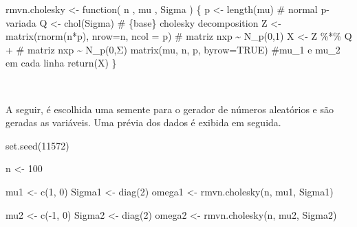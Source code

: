 \documentclass[
  a4paperpaper,
]{article}
\newenvironment{Shaded}{\begin{snugshade}}{\end{snugshade}}
\newcommand{\AttributeTok}[1]{\textcolor[rgb]{0.40,0.45,0.13}{#1}}
\newcommand{\CommentTok}[1]{\textcolor[rgb]{0.37,0.37,0.37}{#1}}
\newcommand{\ConstantTok}[1]{\textcolor[rgb]{0.56,0.35,0.01}{#1}}
\newcommand{\ControlFlowTok}[1]{\textcolor[rgb]{0.00,0.23,0.31}{#1}}
\newcommand{\DecValTok}[1]{\textcolor[rgb]{0.68,0.00,0.00}{#1}}
\newcommand{\FunctionTok}[1]{\textcolor[rgb]{0.28,0.35,0.67}{#1}}
\newcommand{\NormalTok}[1]{\textcolor[rgb]{0.00,0.23,0.31}{#1}}
\newcommand{\OtherTok}[1]{\textcolor[rgb]{0.00,0.23,0.31}{#1}}
\newcommand{\SpecialCharTok}[1]{\textcolor[rgb]{0.37,0.37,0.37}{#1}}
\begin{document}
\begin{Shaded}
\begin{Highlighting}[]
\NormalTok{rmvn.cholesky }\OtherTok{\textless{}{-}} \ControlFlowTok{function}\NormalTok{( n , mu , Sigma ) \{}
\NormalTok{  p }\OtherTok{\textless{}{-}} \FunctionTok{length}\NormalTok{(mu) }\CommentTok{\# normal p{-}variada}
\NormalTok{  Q }\OtherTok{\textless{}{-}} \FunctionTok{chol}\NormalTok{(Sigma) }\CommentTok{\# \{base\} cholesky decomposition}
\NormalTok{  Z }\OtherTok{\textless{}{-}} \FunctionTok{matrix}\NormalTok{(}\FunctionTok{rnorm}\NormalTok{(n}\SpecialCharTok{*}\NormalTok{p), }\AttributeTok{nrow=}\NormalTok{n, }\AttributeTok{ncol =}\NormalTok{ p) }\CommentTok{\# matriz nxp \textasciitilde{} N\_p(0,1)}
\NormalTok{  X }\OtherTok{\textless{}{-}}\NormalTok{ Z }\SpecialCharTok{\%*\%}\NormalTok{ Q }\SpecialCharTok{+} \CommentTok{\# matriz nxp \textasciitilde{} N\_p(0,Σ)}
          \FunctionTok{matrix}\NormalTok{(mu, n, p, }\AttributeTok{byrow=}\ConstantTok{TRUE}\NormalTok{) }\CommentTok{\#mu\_1 e mu\_2 em cada linha}
  \FunctionTok{return}\NormalTok{(X)}
\NormalTok{\}}
\end{Highlighting}
\end{Shaded}

~

A seguir, é escolhida uma semente para o gerador de números aleatórios e
são geradas as variáveis. Uma prévia dos dados é exibida em seguida.

\begin{Shaded}
\begin{Highlighting}[]
\FunctionTok{set.seed}\NormalTok{(}\DecValTok{11572}\NormalTok{)}

\NormalTok{n }\OtherTok{\textless{}{-}} \DecValTok{100}

\NormalTok{mu1 }\OtherTok{\textless{}{-}} \FunctionTok{c}\NormalTok{(}\DecValTok{1}\NormalTok{, }\DecValTok{0}\NormalTok{)}
\NormalTok{Sigma1 }\OtherTok{\textless{}{-}} \FunctionTok{diag}\NormalTok{(}\DecValTok{2}\NormalTok{)}
\NormalTok{omega1 }\OtherTok{\textless{}{-}} \FunctionTok{rmvn.cholesky}\NormalTok{(n, mu1, Sigma1)}

\NormalTok{mu2 }\OtherTok{\textless{}{-}} \FunctionTok{c}\NormalTok{(}\SpecialCharTok{{-}}\DecValTok{1}\NormalTok{, }\DecValTok{0}\NormalTok{)}
\NormalTok{Sigma2 }\OtherTok{\textless{}{-}} \FunctionTok{diag}\NormalTok{(}\DecValTok{2}\NormalTok{)}
\NormalTok{omega2 }\OtherTok{\textless{}{-}} \FunctionTok{rmvn.cholesky}\NormalTok{(n, mu2, Sigma2)}
\end{Highlighting}
\end{Shaded}
\end{document}
